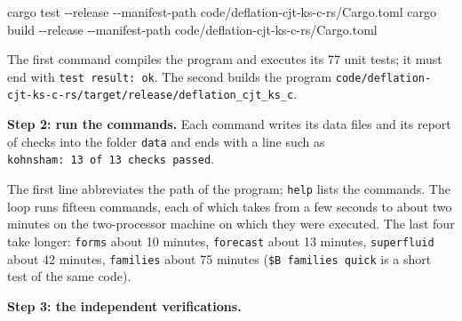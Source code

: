 \documentclass[
  10pt,
]{article}
\newenvironment{Shaded}{}{}
\newcommand{\AttributeTok}[1]{\textcolor[rgb]{0.49,0.56,0.16}{#1}}
\newcommand{\ControlFlowTok}[1]{\textcolor[rgb]{0.00,0.44,0.13}{\textbf{#1}}}
\newcommand{\DataTypeTok}[1]{\textcolor[rgb]{0.56,0.13,0.00}{#1}}
\newcommand{\ExtensionTok}[1]{#1}
\newcommand{\KeywordTok}[1]{\textcolor[rgb]{0.00,0.44,0.13}{\textbf{#1}}}
\newcommand{\NormalTok}[1]{#1}
\newcommand{\OperatorTok}[1]{\textcolor[rgb]{0.40,0.40,0.40}{#1}}
\newcommand{\VariableTok}[1]{\textcolor[rgb]{0.10,0.09,0.49}{#1}}
\begin{document}
\begin{Shaded}
\begin{Highlighting}[]
\ExtensionTok{cargo}\NormalTok{ test  }\AttributeTok{{-}{-}release} \AttributeTok{{-}{-}manifest{-}path}\NormalTok{ code/deflation{-}cjt{-}ks{-}c{-}rs/Cargo.toml}
\ExtensionTok{cargo}\NormalTok{ build }\AttributeTok{{-}{-}release} \AttributeTok{{-}{-}manifest{-}path}\NormalTok{ code/deflation{-}cjt{-}ks{-}c{-}rs/Cargo.toml}
\end{Highlighting}
\end{Shaded}

The first command compiles the program and executes its 77 unit tests;
it must end with \texttt{test\ result:\ ok}. The second builds the
program
\texttt{code/deflation-cjt-ks-c-rs/target/release/deflation\_cjt\_ks\_c}.

\textbf{Step 2: run the commands.} Each command writes its data files
and its report of checks into the folder \texttt{data} and ends with a
line such as \texttt{kohnsham:\ 13\ of\ 13\ checks\ passed}.

\begin{Shaded}
\end{Shaded}

The first line abbreviates the path of the program; \texttt{help} lists
the commands. The loop runs fifteen commands, each of which takes from a
few seconds to about two minutes on the two-processor machine on which
they were executed. The last four take longer: \texttt{forms} about 10
minutes, \texttt{forecast} about 13 minutes, \texttt{superfluid} about
42 minutes, \texttt{families} about 75 minutes
(\texttt{\$B\ families\ quick} is a short test of the same code).

\textbf{Step 3: the independent verifications.}
\end{document}
